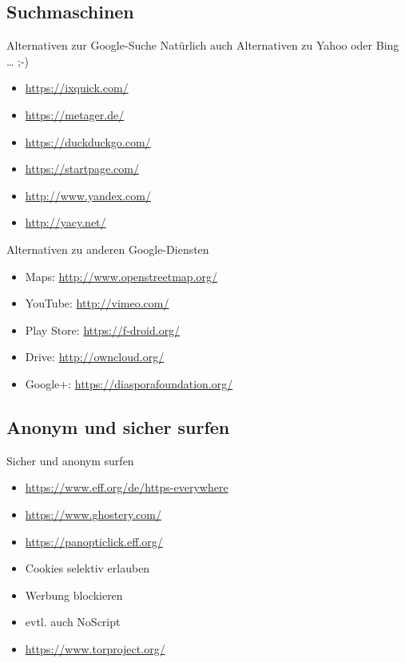 \documentclass{beamer}
\begin{document}
\subsection{Suchmaschinen}

\begin{frame}{Alternativen zur Google-Suche}
    Natürlich auch Alternativen zu Yahoo oder Bing … ;-)

    \begin{itemize}
        \item \url{https://ixquick.com/}
        \item \url{https://metager.de/}
        \item \url{https://duckduckgo.com/}
        \item \url{https://startpage.com/}
        \item \url{http://www.yandex.com/}
        \item \url{http://yacy.net/}
    \end{itemize}
\end{frame}

\begin{frame}{Alternativen zu anderen Google-Diensten}
    \begin{itemize}
        \item Maps: \url{http://www.openstreetmap.org/}
        \item YouTube: \url{http://vimeo.com/}
        \item Play Store: \url{https://f-droid.org/}
        \item Drive: \url{http://owncloud.org/}
        \item Google+: \url{https://diasporafoundation.org/}
    \end{itemize}
\end{frame}

\subsection{Anonym und sicher surfen}

\begin{frame}{Sicher und anonym surfen}
    \begin{itemize}
        \item \url{https://www.eff.org/de/https-everywhere}
        \item \url{https://www.ghostery.com/}
        \item \url{https://panopticlick.eff.org/}
        \item Cookies selektiv erlauben
        \item Werbung blockieren
        \item evtl. auch NoScript
        \item \url{https://www.torproject.org/}
    \end{itemize}
\end{frame}
\end{document}
